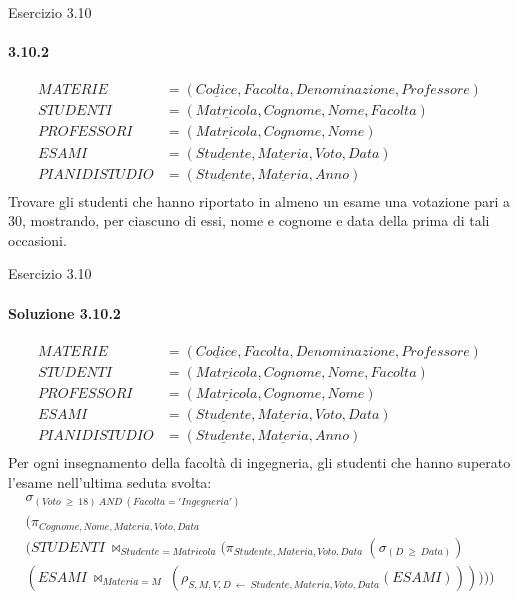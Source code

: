 \def\schemaEx3.10{\small \begin{align*}
    MATERIE &= (\underline{Codice}, Facolta, Denominazione, Professore)\\
    STUDENTI &= (\underline{Matricola}, Cognome, Nome, Facolta)\\
    PROFESSORI &= (\underline{Matricola}, Cognome, Nome)\\
    ESAMI &= (\underline{Studente}, \underline{Materia}, Voto, Data)\\
    PIANIDISTUDIO &= (\underline{Studente}, \underline{Materia}, Anno)\\
    \end{align*}}
%
\begin{frame}{Esercizio 3.10}
    \framesubtitle{3.10.2}
    \schemaEx3.10
    Trovare gli studenti che hanno riportato in almeno un esame una votazione pari a 30, mostrando, per ciascuno di essi, nome e cognome e data della prima di tali occasioni.
\end{frame}
%
\begin{frame}{Esercizio 3.10}
    \framesubtitle{Soluzione 3.10.2}
    \vspace*{-1.2cm}
    \schemaEx3.10
    {\small Per ogni insegnamento della facolt\`a di ingegneria, gli studenti che hanno superato l'esame nell'ultima seduta svolta:}
    \small
    \begin{gather*}
        \sigma_{(Voto~\geq~18)~AND~(Facolta='Ingegneria')}\\
        (\pi_{Cognome,Nome,Materia,Voto,Data}\\
        (STUDENTI~\bowtie_{Studente=Matricola} (\pi_{Studente,Materia,Voto,Data}~(\sigma_{(D~\geq~Data)})\\
        (ESAMI~\bowtie_{Materia=M}~(\rho_{S,M,V,D~\leftarrow~Studente,Materia,Voto,Data}(ESAMI))))))
    \end{gather*}
\end{frame}
